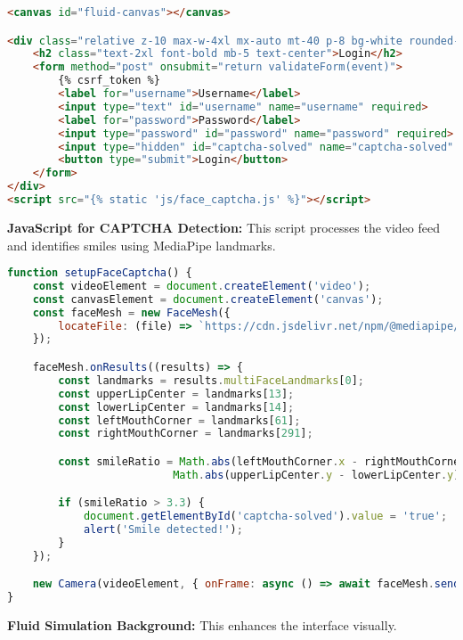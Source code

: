 \documentclass[12pt]{article}
\begin{document}
\begin{lstlisting}[language=HTML, caption=Login Template (login.html)]
<canvas id="fluid-canvas"></canvas>

<div class="relative z-10 max-w-4xl mx-auto mt-40 p-8 bg-white rounded-lg">
    <h2 class="text-2xl font-bold mb-5 text-center">Login</h2>
    <form method="post" onsubmit="return validateForm(event)">
        {% csrf_token %}
        <label for="username">Username</label>
        <input type="text" id="username" name="username" required>
        <label for="password">Password</label>
        <input type="password" id="password" name="password" required>
        <input type="hidden" id="captcha-solved" name="captcha-solved" value="false">
        <button type="submit">Login</button>
    </form>
</div>
<script src="{% static 'js/face_captcha.js' %}"></script>
\end{lstlisting}

\textbf{JavaScript for CAPTCHA Detection:} This script processes the video feed and identifies smiles using MediaPipe landmarks.

\begin{lstlisting}[language=JavaScript, caption=CAPTCHA Detection (face\_captcha.js)]
function setupFaceCaptcha() {
    const videoElement = document.createElement('video');
    const canvasElement = document.createElement('canvas');
    const faceMesh = new FaceMesh({
        locateFile: (file) => `https://cdn.jsdelivr.net/npm/@mediapipe/face_mesh/${file}`
    });

    faceMesh.onResults((results) => {
        const landmarks = results.multiFaceLandmarks[0];
        const upperLipCenter = landmarks[13];
        const lowerLipCenter = landmarks[14];
        const leftMouthCorner = landmarks[61];
        const rightMouthCorner = landmarks[291];

        const smileRatio = Math.abs(leftMouthCorner.x - rightMouthCorner.x) /
                          Math.abs(upperLipCenter.y - lowerLipCenter.y);

        if (smileRatio > 3.3) {
            document.getElementById('captcha-solved').value = 'true';
            alert('Smile detected!');
        }
    });

    new Camera(videoElement, { onFrame: async () => await faceMesh.send({ image: videoElement }) }).start();
}
\end{lstlisting}

\textbf{Fluid Simulation Background:} This enhances the interface visually.
\end{document}
